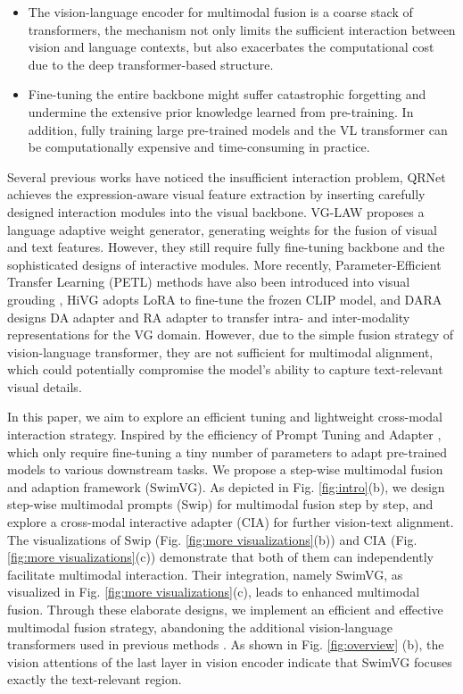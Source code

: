 \begin{itemize}
  \item The vision-language encoder for multimodal fusion is a coarse stack of transformers, the mechanism not only limits the sufficient interaction between vision and language contexts, but also exacerbates the computational cost due to the deep transformer-based structure.
  \item 
  Fine-tuning the entire backbone might suffer catastrophic forgetting and undermine the extensive prior knowledge learned from pre-training. In addition, fully training large pre-trained models and the VL transformer can be computationally expensive and time-consuming in practice.

\end{itemize}



Several previous works have noticed the insufficient
interaction problem, QRNet \cite{ye2022shifting} achieves the expression-aware visual feature extraction by inserting carefully designed interaction modules into the visual backbone. VG-LAW \cite{vg-law} proposes a language adaptive weight generator, generating weights for the fusion of visual and text features. However, they still require fully fine-tuning backbone and the sophisticated designs of interactive modules. More recently, Parameter-Efficient Transfer Learning (PETL) methods have also been introduced into visual grouding \cite{xiao2024hivg,liu2024dara}, HiVG \cite{xiao2024hivg} adopts LoRA to fine-tune the frozen CLIP model, and DARA\cite{liu2024dara} designs DA adapter and RA adapter to transfer intra- and inter-modality representations for the VG domain. However, due to the simple fusion strategy of vision-language transformer, they are not sufficient for multimodal alignment,  which could potentially compromise the model’s ability to capture text-relevant visual details.


In this paper, we aim to explore an efficient tuning and lightweight cross-modal interaction strategy. Inspired by the efficiency of Prompt Tuning \cite{khattak2023maple,liu2024dap,shi2024explicit} and Adapter \cite{chen2022adaptformer}, which only require fine-tuning a tiny number of parameters to adapt pre-trained models to various downstream tasks. We propose a step-wise multimodal fusion and adaption framework (SwimVG). {As depicted in Fig. \ref{fig:intro}(b), we design step-wise multimodal prompts (Swip) for multimodal fusion step by step, and explore a cross-modal interactive adapter (CIA) for further vision-text alignment. The visualizations of Swip (Fig. \ref{fig:more visualizations}(b)) and CIA (Fig. \ref{fig:more visualizations}(c)) demonstrate that both of them can independently facilitate multimodal interaction. Their integration, namely SwimVG, as visualized in Fig. \ref{fig:more visualizations}(c), leads to enhanced multimodal fusion.}
Through these elaborate designs, we implement an efficient and effective multimodal fusion strategy, abandoning the additional vision-language transformers used in previous methods \cite{deng2021transvg,transvg++,xiao2023clip,liu2024dara,xiao2024hivg}. As shown in Fig. \ref{fig:overview} (b), the vision attentions of the last layer in vision encoder indicate that SwimVG focuses exactly the text-relevant region.
 
